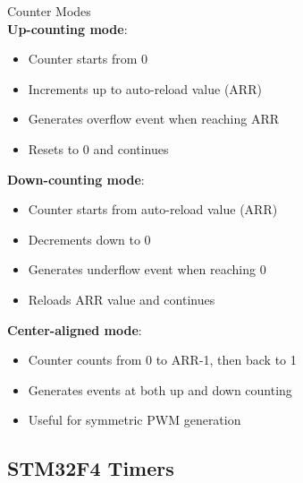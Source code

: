 \begin{minipage}{0.42\linewidth}
\begin{concept}{Counter Modes}\\
\textbf{Up-counting mode}:
\begin{itemize}
    \item Counter starts from 0
    \item Increments up to auto-reload value (ARR)
    \item Generates overflow event when reaching ARR
    \item Resets to 0 and continues
\end{itemize}
\textbf{Down-counting mode}:
\begin{itemize}
    \item Counter starts from auto-reload value (ARR)
    \item Decrements down to 0
    \item Generates underflow event when reaching 0
    \item Reloads ARR value and continues
\end{itemize}
\textbf{Center-aligned mode}:
\begin{itemize}
    \item Counter counts from 0 to ARR-1, then back to 1
    \item Generates events at both up and down counting
    \item Useful for symmetric PWM generation
\end{itemize}
\end{concept}
\end{minipage}

\subsection{STM32F4 Timers}


